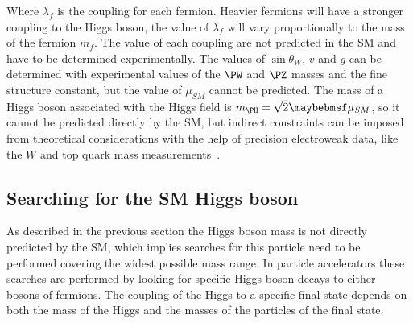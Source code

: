 Where $\lambda_{f}$ is the coupling for each fermion. Heavier fermions will have a stronger coupling to the Higgs boson, the value of $\lambda_{f}$ will vary proportionally to the mass of the fermion $m_{f}$. The value of each coupling are not predicted in the \gls{SM} and have to be determined experimentally. The values of $\sin{\theta_{W}}$, $v$ and $g$ can be determined with experimental values of the $\PW$ and $\PZ$ masses and the fine structure constant, but the value of $\mu_{SM}$ cannot be predicted. The mass of a Higgs boson associated with the Higgs field is $m_{\PH}=\sqrt{2}\mu_{SM}$, so it cannot be predicted directly by the \gls{SM}, but indirect constraints can be imposed from theoretical considerations with the help of precision electroweak data, like the $W$ and top quark mass measurements~\cite{SITE:lepewwg}.

\subsection{Searching for the SM Higgs boson}
\label{SUBSECTION:Theory_SM_SearchingSMHiggs}


As described in the previous section the Higgs boson mass is not directly predicted by the \gls{SM}, which implies searches for this particle need to be performed covering the widest possible mass range. In particle accelerators these searches are performed by looking for specific Higgs boson decays to either bosons of fermions. The coupling of the Higgs to a specific final state depends on both the mass of the Higgs and the masses of the particles of the final state. 

